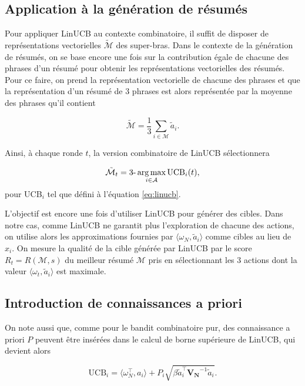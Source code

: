 \subsection{Application à la génération de résumés}

Pour appliquer LinUCB au contexte combinatoire, il suffit de disposer 
de représentations vectorielles $\tilde{\mathcal{M}}$ des super-bras.
Dans le contexte de la génération de résumés, on se base encore une fois 
sur la contribution égale de chacune des phrases d'un résumé pour obtenir 
les représentations vectorielles des résumés.
Pour ce faire, on prend la représentation vectorielle 
de chacune des phrases et que la représentation d'un résumé 
de 3 phrases est alors représentée par la moyenne des phrases
qu'il contient

\begin{equation}
    \tilde{\mathcal{M}} = \frac{1}{3}\sum_{i \in \mathcal{M}} \tilde{a}_i.
\end{equation}

Ainsi, à chaque ronde $t$, la version combinatoire de LinUCB sélectionnera 

\begin{equation*}
\tilde{\mathcal{M}}_t = \text{3-}\operatorname*{arg\,max}_{i \in \mathcal{A}} \text{UCB}_i(t),
\end{equation*}
pour UCB$_i$ tel que défini à l'équation \eqref{eq:linucb}.

L'objectif est encore une fois d'utiliser LinUCB pour générer des cibles.
Dans notre cas, comme LinUCB ne garantit plus l'exploration de chacune des 
actions, on utilise alors les approximations fournies par $\langle \omega_N, \tilde{a}_i \rangle$
comme cibles au lieu de $\hat{x}_i$.
On mesure la qualité de la cible générée par LinUCB par le score $R_t=R(\mathcal{M}, s)$ 
du meilleur résumé $\mathcal{M}$ pris en sélectionnant les 3 actions dont la valeur 
$\langle \omega_t, \tilde{a}_i \rangle$ est maximale.

\subsection{Introduction de connaissances a priori}

On note aussi que, comme pour le bandit combinatoire pur, des connaissance a priori $P$
peuvent être insérées dans le calcul de borne supérieure de LinUCB, qui devient alors 

\begin{equation}
    \text{UCB}_i = \langle \omega_N^\top, a_i \rangle +  P_i\sqrt{\beta\tilde{a}_i^\top \mathbf{V_N}^{-1} \tilde{a}_i}.
    \label{eq:linucb_prior}
\end{equation}

